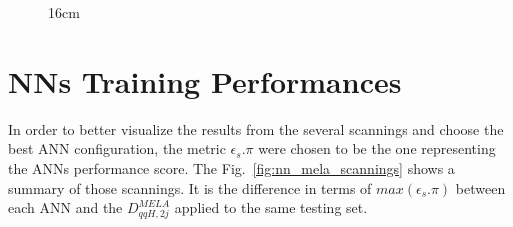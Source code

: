 \begin{figure}[hbtp]{16cm}
{		\label{}
	}
	\label{fig:nn_training_outputs}
\end{figure}


\section{NNs Training Performances}
In order to better visualize the results from the several scannings and choose the best ANN configuration, the metric $\epsilon_{s}.\pi$ were chosen to be the one representing the ANNs performance score. The Fig.~\ref{fig:nn_mela_scannings} shows a summary of those scannings. It is the difference in terms of $max(\epsilon_{s}.\pi)$ between each ANN and the $D_{qqH, 2j}^{MELA}$ applied to the same testing set.

